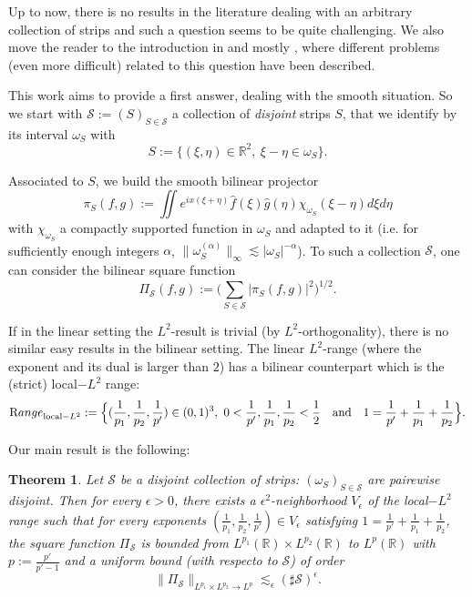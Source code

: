 \documentclass[a4paper,11pt,oneside]{amsart}
\theoremstyle{plain}
\newtheorem{theorem}{Theorem}[section]
\theoremstyle{definition}
\begin{document}
Up to now, there is no results in the literature dealing with an arbitrary collection of strips and such a question seems to be quite challenging. We also move the reader to the introduction in \cite{BBLV,BBLV2} and mostly \cite[Paragraph III in Section 1.2.3]{BBLV2}, where different problems (even more difficult) related to this question have been described.

\bigskip

This work aims to provide a first answer, dealing with the smooth situation. So we start with ${\mathcal S}:=(S)_{S\in {\mathcal S}}$ a collection of {\it disjoint} strips $S$, that we identify by its interval $\omega_{S}$ with
$$ S:=\{(\xi,\eta)\in{\mathbb R}^2,\ \xi-\eta \in \omega_{S}\}.$$

Associated to $S$, we build the smooth bilinear projector
$$ \pi_{S}(f,g):= \iint e^{ix(\xi+\eta)} \hat{f}(\xi) \hat{g}(\eta) \chi_{\omega_S}(\xi-\eta) d\xi d\eta$$
with $\chi_{\omega_S}$ a compactly supported function in $\omega_{S}$ and adapted to it (i.e. for sufficiently enough integers $\alpha$, $\|\omega_{S}^{(\alpha)}\|_\infty\lesssim |\omega_S|^{-\alpha}$).
To such a collection ${\mathcal S}$, one can consider the bilinear square function
$$ \Pi_{{\mathcal S}}(f,g):= \Big( \sum_{S\in{\mathcal S}} |\pi_S(f,g)|^2 \Big)^{1/2}.$$


If in the linear setting the $L^2$-result is trivial (by $L^2$-orthogonality), there is no similar easy results in the bilinear setting. The linear $L^2$-range (where the exponent and its dual is larger than $2$) has a bilinear counterpart which is the (strict) local$-L^2$ range:
$$ {\textrm Range}_{\textrm{local}-L^2}:=\Big\{(\frac{1}{p_1},\frac{1}{p_2},\frac{1}{p'})\in (0,1)^3,\ 0<\frac{1}{p'},\frac{1}{p_1},\frac{1}{p_2}<\frac{1}{2} \quad \textrm{and} \quad 1=\frac{1}{p'}+\frac{1}{p_1}+\frac{1}{p_2}\Big\}.$$

Our main result is the following:

\begin{theorem} \label{thm:main} Let ${\mathcal S}$ be a disjoint collection of strips: $(\omega_S)_{S\in{\mathcal S}}$ are pairewise disjoint. Then for every $\epsilon>0$, there exists a $\epsilon^2$-neighborhood $V_{\epsilon}$ of the local$-L^2$ range such that for every exponents $(\frac{1}{p_1},\frac{1}{p_2},\frac{1}{p'})\in V_{\epsilon}$ satisfying $1=\frac{1}{p'}+\frac{1}{p_1}+\frac{1}{p_2}$, the square function $\Pi_{\mathcal S}$ is bounded from $L^{p_1}({\mathbb R}) \times L^{p_2}({\mathbb R})$ to $L^{p}({\mathbb R})$ with $p:=\frac{p'}{p'-1}$ and a uniform bound (with respecto to ${\mathcal S}$) of order
$$ \|\Pi_{\mathcal S}\|_{L^{p_1} \times L^{p_2} \to L^{p}} \lesssim_{\epsilon} (\sharp \mathcal S)^{\epsilon}.$$
\end{theorem}
\end{document}
